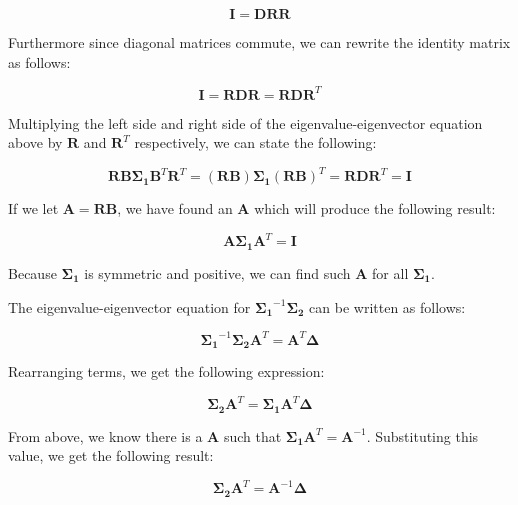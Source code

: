 \documentclass[fleqn]{article}
\begin{document}
\begin{enumerate}
		\begin{equation*}
			\mathbf{I} = \mathbf{DRR}
		\end{equation*}
		
		Furthermore since diagonal matrices commute, we can rewrite the identity matrix as follows:
		
		\begin{equation*}
			\mathbf{I} = \mathbf{RDR} = \mathbf{R}\mathbf{D}\mathbf{R}^T
		\end{equation*}
		
		Multiplying the left side and right side of the eigenvalue-eigenvector equation above by $\mathbf{R}$ and $\mathbf{R}^T$ respectively, we can state the following:
		
		\begin{equation*}
			\mathbf{R}\mathbf{B}\mathbf{\Sigma_1}\mathbf{B}^T\mathbf{R}^T = (\mathbf{RB})\mathbf{\Sigma_1}(\mathbf{RB})^T = \mathbf{R}\mathbf{D}\mathbf{R}^T = \mathbf{I}
		\end{equation*}
		
		If we let $\mathbf{A} = \mathbf{RB}$, we have found an $\mathbf{A}$ which will produce the following result:
		
		\begin{equation*}
			\mathbf{A}\mathbf{\Sigma_1}\mathbf{A}^T = \mathbf{I}
		\end{equation*}
		
		Because $\mathbf{\Sigma_1}$ is symmetric and positive, we can find such $\mathbf{A}$ for all $\mathbf{\Sigma_1}$.
		
		The eigenvalue-eigenvector equation for $\mathbf{\Sigma_1}^{-1}\mathbf{\Sigma_2}$ can be written as follows:
		
		\begin{equation*}
			\mathbf{\Sigma_1}^{-1}\mathbf{\Sigma_2}\mathbf{A}^T = \mathbf{A}^T\mathbf{\Delta}
		\end{equation*}
		
		Rearranging terms, we get the following expression:
		
		\begin{equation*}
			\mathbf{\Sigma_2}\mathbf{A}^T = \mathbf{\Sigma_1}\mathbf{A}^T\mathbf{\Delta}
		\end{equation*}
		
		From above, we know there is a $\mathbf{A}$ such that $\mathbf{\Sigma_1}\mathbf{A}^T = \mathbf{A}^{-1}$. Substituting this value, we get the following result:
		 
		\begin{equation*}
			\mathbf{\Sigma_2}\mathbf{A}^T = \mathbf{A}^{-1}\mathbf{\Delta}
		\end{equation*}
		

\end{enumerate}
\end{document}
